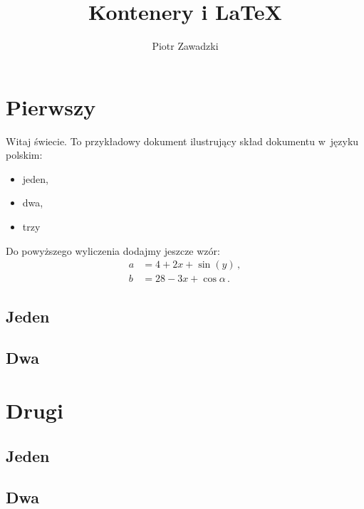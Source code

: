 \documentclass{article}
\author{Piotr Zawadzki}
\title{Kontenery i \LaTeX}
\begin{document}
\maketitle{}

\tableofcontents{}

\section{Pierwszy}

Witaj świecie. To przykładowy dokument ilustrujący skład dokumentu w~języku polskim:
\begin{itemize}
  \item jeden,
  \item dwa,
  \item trzy
\end{itemize}
Do powyższego wyliczenia dodajmy jeszcze wzór:
\begin{align}
  a & = 4+2x+\sin(y) \,,         \\
  b & = 28 -3 x + \cos\alpha \,.
\end{align}

\subsection{Jeden} \lipsum{}

\subsection{Dwa} \lipsum{}

\section{Drugi} \lipsum{} \lipsum{}

\subsection{Jeden} \lipsum{}

\subsection{Dwa} \lipsum{}
\end{document}
